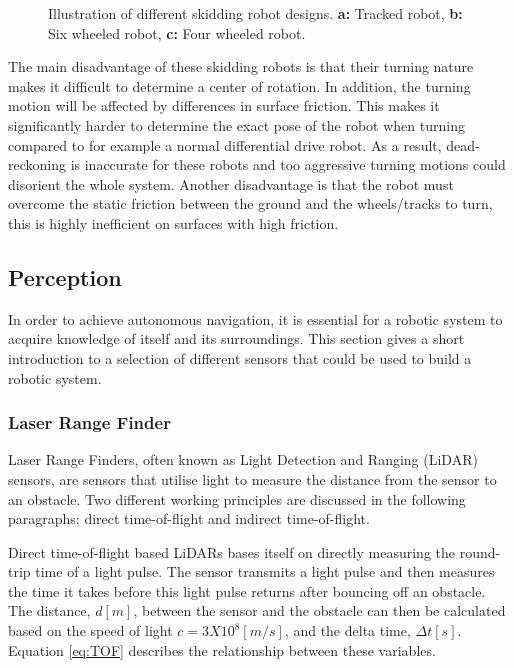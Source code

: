 \begin{figure}[htp]
  \centering
  
  \caption{Illustration of different skidding robot designs. \textbf{a:} Tracked robot, \textbf{b:} Six wheeled robot, \textbf{c:} Four wheeled robot.}
  \label{fig:skidDrive}
\end{figure}
The main disadvantage of these skidding robots is that their turning nature makes it difficult to determine a center of rotation. In addition, the turning motion will be affected by differences in surface friction. This makes it significantly harder to determine the exact pose of the robot when turning compared to for example a normal differential drive robot. As a result, dead-reckoning is inaccurate for these robots and too aggressive turning motions could disorient the whole system. Another disadvantage is that the robot must overcome the static friction between the ground and the wheels/tracks to turn, this is highly inefficient on surfaces with high friction.


\subsection{Perception}\label{sec:T:AN:Perception}
In order to achieve autonomous navigation, it is essential for a robotic system to acquire knowledge of itself and its surroundings. This section gives a short introduction to a selection of different sensors that could be used to build a robotic system.

\subsubsection{Laser Range Finder}
Laser Range Finders, often known as Light Detection and Ranging (LiDAR) sensors, are sensors that utilise light to measure the distance from the sensor to an obstacle. Two different working principles are discussed in the following paragraphs; direct time-of-flight and indirect time-of-flight.

Direct time-of-flight based LiDARs bases itself on directly measuring the round-trip time of a light pulse. The sensor transmits a light pulse and then measures the time it takes before this light pulse returns after bouncing off an obstacle. The distance, $d[m]$, between the sensor and the obstacle can then be calculated based on the speed of light $c=3X10^8[m/s]$, and the delta time, $\Delta t[s]$. Equation \ref{eq:TOF} describes the relationship between these variables.

